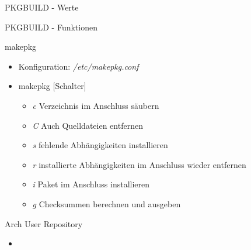 \begin{slide}{PKGBUILD - Werte}
	
\end{slide}
\begin{slide}{PKGBUILD - Funktionen}
	
\end{slide}


\begin{slide}{makepkg}
	\begin{itemize}
		\item{Konfiguration: \textit{/etc/makepkg.conf}}
		\item{makepkg [Schalter]
			\begin{itemize}
				\item{\textit{c} Verzeichnis im Anschluss s\"{a}ubern}
				\item{\textit{C} Auch Quelldateien entfernen}
				\item{\textit{s} fehlende Abh\"{a}ngigkeiten installieren}
				\item{\textit{r} installierte Abh\"{a}ngigkeiten im Anschluss
					wieder entfernen}
				\item{\textit{i} Paket im Anschluss installieren}
				\item{\textit{g} Checksummen berechnen und ausgeben}
			\end{itemize}
		}
	\end{itemize}
\end{slide}

\begin{slide}{Arch User Repository}
	\begin{itemize}
		\item{}
	\end{itemize}
\end{slide}

